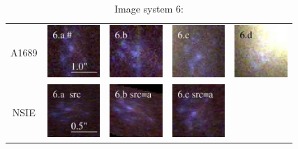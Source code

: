 \documentclass[useAMS,usenatbib]{mn2e}
\begin{document}
\begin{table}
  \caption{Image system 6:}\vspace{0mm}
  \begin{tabular}{ccccc}
    \multicolumn{1}{m{1cm}}{{\Large A1689}}
    & \multicolumn{1}{m{1.7cm}}{\includegraphics[height=2.00cm,clip]{figs/nsie_img/rgb.img_6_a.ps}}
    & \multicolumn{1}{m{1.7cm}}{\includegraphics[height=2.00cm,clip]{figs/nsie_img/rgb.img_6_b.ps}}
    & \multicolumn{1}{m{1.7cm}}{\includegraphics[height=2.00cm,clip]{figs/nsie_img/rgb.img_6_c.ps}}
    & \multicolumn{1}{m{1.7cm}}{\includegraphics[height=2.00cm,clip]{figs/nsie_img/rgb.img_6_d.ps}} \\
    \multicolumn{1}{m{1cm}}{{\Large NSIE}}
    & \multicolumn{1}{m{1.7cm}}{\includegraphics[height=2.00cm,clip]{figs/nsie_img/rgb.src_6_a.ps}}
    & \multicolumn{1}{m{1.7cm}}{\includegraphics[height=2.00cm,clip]{figs/nsie_img/rgb.pre_6_b_a_tri.ps}}
    & \multicolumn{1}{m{1.7cm}}{\includegraphics[height=2.00cm,clip]{figs/nsie_img/rgb.pre_6_c_a_tri.ps}}

\end{tabular}
\end{table}
\end{document}
